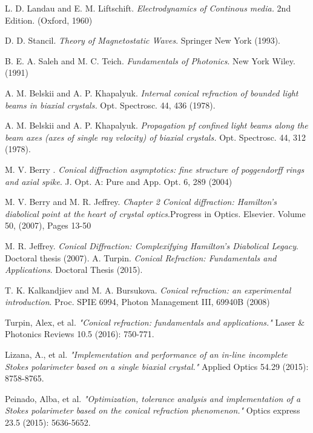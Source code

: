 \documentclass[11pt, a4paper, twoside]{article} %
\begin{document}
\newpage
\begin{thebibliography}{1}
{\small 
{}
L. D. Landau and E. M. Liftschift. {\em Electrodynamics of Continous media.} 2nd Edition. (Oxford, 1960)

D. D. Stancil. {\em Theory of Magnetostatic Waves}. Springer New York (1993).

B. E. A. Saleh and M. C. Teich. {\em Fundamentals of Photonics}. New York Wiley. (1991)

A. M. Belskii and A. P. Khapalyuk. {\em Internal conical refraction of bounded light beams in biaxial crystals.} Opt. Spectrosc. 44, 436 (1978).

A. M. Belskii and A. P. Khapalyuk. {\em Propagation pf confined light beams along the beam axes (axes of single ray velocity) of biaxial crystals.} Opt. Spectrosc. 44, 312 (1978).

M. V. Berry . {\em Conical diffraction asymptotics: fine structure of poggendorff rings and axial spike}. J. Opt. A: Pure and App. Opt. 6, 289 (2004)

M. V. Berry and M. R. Jeffrey. {\em Chapter 2 Conical diffraction: Hamilton's diabolical point at the heart of crystal optics}.Progress in Optics. Elsevier. Volume 50, (2007), Pages 13-50

M. R. Jeffrey. {\em Conical Diffraction: Complexifying
Hamilton’s Diabolical Legacy}. Doctoral thesis (2007).
A. Turpin. {\em Conical Refraction: Fundamentals and Applications}. Doctoral Thesis (2015).

T. K. Kalkandjiev and M. A. Bursukova. {\em Conical refraction: an experimental introduction}. Proc. SPIE 6994, Photon Management III, 69940B (2008)

Turpin, Alex, et al. {\em "Conical refraction: fundamentals and applications."} Laser \& Photonics Reviews 10.5 (2016): 750-771.

Lizana, A., et al. {\em "Implementation and performance of an in-line incomplete Stokes polarimeter based on a single biaxial crystal."} Applied Optics 54.29 (2015): 8758-8765.

Peinado, Alba, et al. {\em "Optimization, tolerance analysis and implementation of a Stokes polarimeter based on the conical refraction phenomenon."} Optics express 23.5 (2015): 5636-5652.

}
\end{thebibliography}
\end{document}
